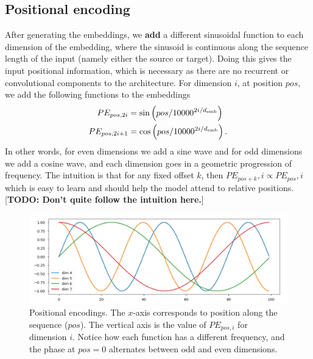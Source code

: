 \documentclass[11pt]{article}
\numberwithin{equation}{section}
\begin{document}
\subsection{Positional encoding} \label{sec:pos_enc}
After generating the embeddings, we \textbf{add} a different sinusoidal function to each dimension of the embedding, where the sinusoid is continuous along the sequence length of the input (namely either the source or target). Doing this gives the input positional information, which is necessary as there are no recurrent or convolutional components to the architecture. For dimension $i$, at position $pos$, we add the following functions to the embeddings
\begin{align}
PE_{pos, 2i} &= \sin\left(pos/10000^{2i/d_{\text{emb}}}\right) \\
PE_{pos, 2i+1} &= \cos\left(pos/10000^{2i/d_{\text{emb}}}\right). 
\end{align}
In other words, for even dimensions we add a sine wave and for odd dimensions we add a cosine wave, and each dimension goes in a geometric progression of frequency. The intuition is that for any fixed offset $k$, then $PE_{pos+k},i \propto PE_{pos},i$ which is easy to learn and should help the model attend to relative positions. [\textbf{TODO: Don't quite follow the intuition here.}]

\begin{figure}
\begin{center}
\includegraphics[width=0.7\columnwidth]{../figures/pos_enc.jpg}  
\end{center}
\caption{Positional encodings. The $x$-axis corresponds to position along the sequence ($pos$). The vertical axis is the value of $PE_{pos, i}$ for dimension $i$. Notice how each function has a different frequency, and the phase at $pos=0$ alternates between odd and even dimensions.}
\label{fig:pos_enc}
\end{figure}
\end{document}
